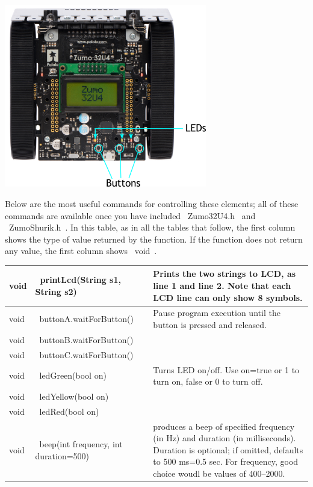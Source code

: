 \documentclass[oneside]{stml-l}
\numberwithin{figure}{chapter}
\begin{document}
\includegraphics[height=8cm]{figures/buttons.png}

Below are the most useful commands for controlling these elements;
all of these commands are available once you have included ~Zumo32U4.h~ and
~ZumoShurik.h~. In this table, as in all the tables that follow, the first column
shows the type of value returned by the function. If the function does not
return any value, the first column shows ~void~.

\begin{tabular}{|l | l | p{7cm}|}
\hline
void & ~printLcd(String s1, String s2)~ & Prints the two strings to LCD,
        as line 1 and line 2. Note that each LCD line can only show 8 symbols.\\
\hline
void & ~buttonA.waitForButton()~ & Pause program execution
                      until the button  is pressed and released.\\
\cline{1-2}
void & ~buttonB.waitForButton()~& \\
\cline{1-2}
void & ~buttonC.waitForButton()~& \\
\hline
void & ~ledGreen(bool on)~ & Turns LED on/off. Use on=true or 1 to turn on,
                              false or 0 to turn off.\\
\cline{1-2}
void & ~ledYellow(bool on)~& \\
\cline{1-2}
void & ~ledRed(bool on)~& \\
\hline
void & ~beep(int frequency, int duration=500)~& produces a beep of specified
frequency (in Hz) and duration (in milliseconds). Duration is optional; if omitted,
defaults to 500 ms=0.5 sec. For frequency, good choice woudl be values of 400--2000.
\\
\hline
\end{tabular}
\end{document}
